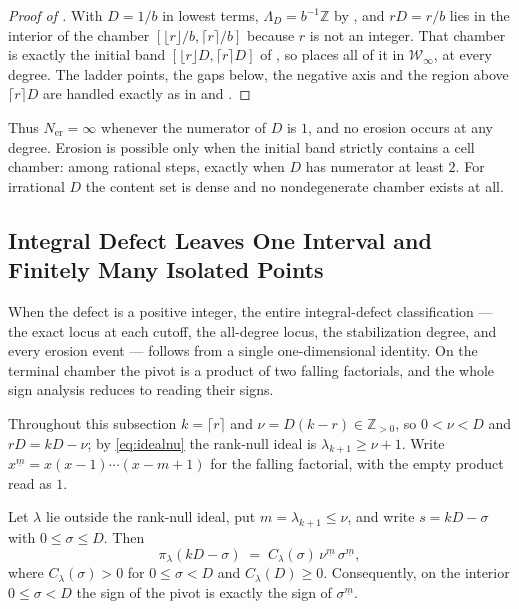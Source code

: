 \documentclass[11pt,letterpaper]{article}
\newcommand{\Zint}{\mathbb{Z}}
\begin{document}
\begin{proof}[Proof of ]
With $D=1/b$ in lowest terms, $\Lambda_D=b^{-1}\Zint$ by , and
$rD=r/b$ lies in the interior of the chamber
$[\lfloor r\rfloor/b,\lceil r\rceil/b]$ because $r$ is not an integer. That
chamber is exactly the initial band $[\lfloor r\rfloor D,\lceil r\rceil D]$ of
, so  places all of it in
$\mathcal{W}_\infty$, at every degree. The ladder points, the gaps below, the
negative axis and the region above $\lceil r\rceil D$ are handled exactly as in
 and .
\end{proof}

Thus $N_{\mathrm{er}}=\infty$ whenever the numerator of $D$ is $1$, and no
erosion occurs at any degree. Erosion is possible only when the initial band
strictly contains a cell chamber: among rational steps, exactly when $D$ has
numerator at least $2$. For irrational $D$ the content set is dense and no
nondegenerate chamber exists at all.

\subsection{Integral Defect Leaves One Interval and Finitely Many Isolated Points}

When the defect is a positive integer, the entire integral-defect
classification --- the exact locus at each cutoff, the all-degree locus, the
stabilization degree, and every erosion event --- follows from a single
one-dimensional identity. On the terminal chamber the pivot is a product of two
falling factorials, and the whole sign analysis reduces to reading their signs.

Throughout this subsection $k=\lceil r\rceil$ and $\nu=D(k-r)\in\Zint_{>0}$, so $0<\nu<D$ and
$rD=kD-\nu$; by \eqref{eq:idealnu} the rank-null ideal is
$\lambda_{k+1}\ge\nu+1$. Write $x^{\underline m}=x(x-1)\cdots(x-m+1)$ for the
falling factorial, with the empty product read as $1$.

\begin{lemma}
\label{lem:terminal}
Let $\lambda$ lie outside the rank-null ideal, put $m=\lambda_{k+1}\le\nu$, and
write $s=kD-\sigma$ with $0\le\sigma\le D$. Then
\begin{equation}
  \pi_\lambda(kD-\sigma)\;=\;C_\lambda(\sigma)\,\nu^{\underline m}\,
  \sigma^{\underline m},
  \label{eq:terminalpivot}
\end{equation}
where $C_\lambda(\sigma)>0$ for $0\le\sigma<D$ and $C_\lambda(D)\ge0$.
Consequently, on the interior $0\le\sigma<D$ the sign of the pivot is exactly the
sign of $\sigma^{\underline m}$.
\end{lemma}
\end{document}
